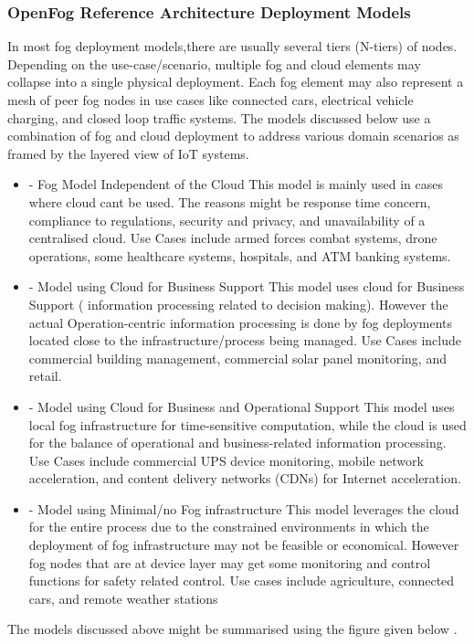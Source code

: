 \documentclass{article}
\begin{document}
\subsubsection{OpenFog Reference Architecture Deployment Models} 
In most fog deployment models,there are usually several tiers (N-tiers) of nodes. 
Depending on the use-case/scenario, multiple fog and cloud elements may collapse into a single physical deployment. Each fog element may also represent a mesh of peer fog nodes in use cases like connected cars, electrical vehicle charging, and closed loop traffic systems.
The models discussed below\cite{openfogconsortium2017} use a combination of fog and cloud deployment to address various domain scenarios as framed by the layered view of IoT systems. 
\begin{itemize}
\item - Fog Model Independent of the Cloud
This model is mainly used in cases where cloud cant be used. The reasons might be response time concern, compliance to regulations, security and privacy, and unavailability of a centralised cloud. 
Use Cases include armed forces combat systems, drone operations, some healthcare systems, hospitals, and ATM banking systems\cite{openfogconsortium2017}.

\item - Model using Cloud for Business Support
This model uses cloud for Business Support ( information processing related to decision making).  However the actual Operation-centric information processing is done by fog deployments located close to the infrastructure/process being managed.
Use Cases include commercial building management, commercial solar panel monitoring, and retail\cite{openfogconsortium2017}.

\item - Model using Cloud for Business and Operational Support
This model uses local fog infrastructure for time-sensitive computation, while the cloud is used for the balance of operational and business-related information processing.    
Use Cases include commercial UPS device monitoring, mobile network acceleration, and content delivery networks (CDNs) for Internet acceleration\cite{openfogconsortium2017}.

\item - Model using Minimal/no Fog infrastructure
This model leverages the cloud for the entire process due to the constrained environments in which the deployment of fog infrastructure may not be feasible or economical. However fog nodes that are at device layer may get some monitoring and control functions for safety related control.
Use cases include agriculture, connected cars, and remote weather stations\cite{openfogconsortium2017}
\end{itemize}
The models discussed above might be summarised using the figure given below
\cite{openfogconsortium2017}.
\end{document}
